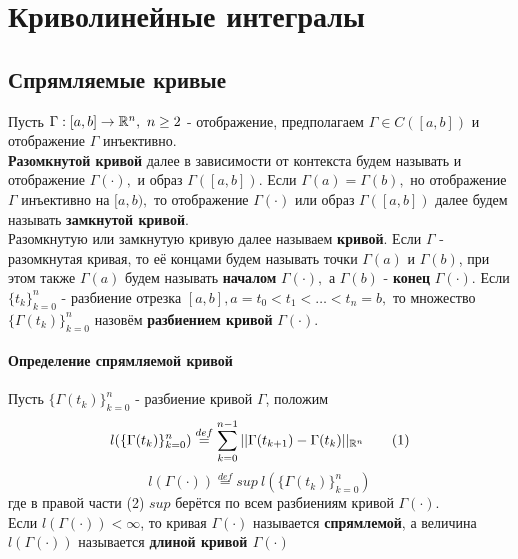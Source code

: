 \documentclass[main]{subfiles}
\begin{document}
\chapter{Криволинейные интегралы}

\section{Спрямляемые кривые}
 \begin{definition}
     Пусть $\Gamma:[a,b]\rightarrow {\vR^n},\ n\geq 2$ - отображение, предполагаем $\Gamma\in C([a,b])$ и отображение $\Gamma$ инъективно.\\
      \textbf{Разомкнутой кривой} далее в зависимости от контекста будем называть и отображение $\Gamma(\cdot),$ и образ $\Gamma([a,b])$. 
      Если $\Gamma(a)=\Gamma(b),$ но отображение $\Gamma$ инъективно на $[a,b),$ то отображение $\Gamma(\cdot)$ или образ $\Gamma([a,b])$
       далее будем называть \textbf{замкнутой кривой}. \\ Разомкнутую или замкнутую кривую далее называем \textbf{кривой}. 
       Если $\Gamma$ - разомкнутая кривая, то её концами будем называть точки $\Gamma(a)$ и $\Gamma(b)$, 
       при этом также $\Gamma(a)$ будем называть \textbf{началом} $\Gamma(\cdot),$ а $\Gamma(b)$ - 
       \textbf{конец} $\Gamma(\cdot).$ Если $\{ t_k\}^n_{k=0}$ - разбиение отрезка
        $[a,b], a=t_0<t_1<\dots<t_n=b,$ то множество $\{ \Gamma(t_k)\}_{k=0}^n$ назовём \textbf{разбиением кривой} $\Gamma(\cdot)$.
 \end{definition}
    
 
 \subsubsection{Определение спрямляемой кривой}
 Пусть $\{ \Gamma(t_k)\}^n_{k=0}$ - разбиение кривой $\Gamma$, положим
 \[ l(\{\Gamma(t_k)\}^n_{k=0})\stackrel{def}{=}\sum\limits_{k=0}^{n-1}|| \Gamma(t_{k+1})-\Gamma(t_k)||_{\mathbb{R}^n} \tag{1} \]
 \[ l(\Gamma(\cdot))\overset{def}{=}sup\ l(\{\Gamma(t_k)\}^n_{k=0}) \tag{2} \]
 где в правой части (2) $sup$ берётся по всем разбиениям кривой $\Gamma(\cdot).$\\
 Если $l(\Gamma(\cdot))<\infty$, то кривая $\Gamma(\cdot)$ называется \textbf{спрямлемой}, а величина $l(\Gamma(\cdot))$ называется \textbf{длиной кривой $\Gamma(\cdot)$}
\end{document}

